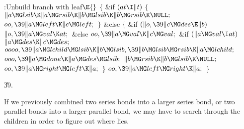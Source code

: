 \B{}:Unbuild branch with leaf\X${}\E{}$\6
${}\{{}$\1\6
\&{if} ${}(\\{at}\I\|t){}$\5
${}\{{}$\1\6
${}\|a\MG\\{lsib}\K\|a\MG\\{rsib}\K\|b\MG\\{lsib}\K\|b\MG\\{rsib}\K\NULL;{}$\6
${}\\{oo},\39\|a\MG\\{left}\K\|c\MG\\{left};{}$\6
\4${}\}{}$\5
\2\&{else}\5
${}\{{}$\1\6
\&{if} ${}(\|o,\39\|c\MG\\{des}\E\|b){}$\1\5
${}\|o,\39\|a\MG\\{val}\K\\{at};{}$\2\6
\&{else}\1\5
${}\\{oo},\39\|a\MG\\{val}\K\|c\MG\\{val};{}$\2\6
\&{if} ${}(\|a\MG\\{val}\I\\{at}){}$\1\5
${}\|a\MG\\{des}\K\|c\MG\\{des};{}$\2\6
${}\\{oooo},\39\|a\MG\\{lchild}\MG\\{lsib}\K\|b\MG\\{lsib},\39\|b\MG\\{lsib}\MG%
\\{rsib}\K\|a\MG\\{lchild};{}$\6
${}\\{ooo},\39\|a\MG\\{done}\K\|a\MG\\{des}\MG\\{lsib};{}$\6
${}\|b\MG\\{rsib}\K\|b\MG\\{lsib}\K\NULL;{}$\6
${}\\{oo},\39\|a\MG\\{right}\MG\\{left}\K\|a;{}$\6
\4${}\}{}$\2\6
${}\\{oo},\39\|a\MG\\{left}\MG\\{right}\K\|a;{}$\6
\4${}\}{}$\2\par
\U39.\fi

If we previously combined two series bonds into a
larger series bond, or
two parallel bonds into a larger parallel bond, we may have to search through
the children in order to figure out where  lies.


